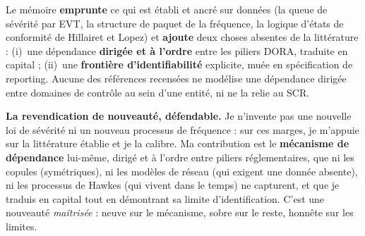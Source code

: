 \documentclass[11pt,a4paper]{article}
\begin{document}
Le mémoire \textbf{emprunte} ce qui est établi et ancré sur données (la queue de sévérité par
EVT, la structure de paquet de la fréquence, la logique d'états de conformité de Hillairet et
Lopez) et \textbf{ajoute} deux choses absentes de la littérature : (i)~une dépendance
\textbf{dirigée et à l'ordre} entre les piliers DORA, traduite en
capital ; (ii)~une \textbf{frontière d'identifiabilité} explicite, muée en spécification de
reporting. Aucune des références recensées ne modélise une dépendance dirigée entre domaines
de contrôle au sein d'une entité, ni ne la relie au SCR.

\begin{cle}
\textbf{La revendication de nouveauté, défendable.} \og Je n'invente pas une nouvelle loi de
sévérité ni un nouveau processus de fréquence : sur ces marges, je m'appuie sur la
littérature établie et je la calibre. Ma contribution est le \textbf{mécanisme de dépendance}
lui-même, dirigé et à l'ordre entre piliers réglementaires, que ni les copules (symétriques),
ni les modèles de réseau (qui exigent une donnée absente), ni les processus de Hawkes (qui
vivent dans le temps) ne capturent, et que je traduis en capital tout en démontrant sa limite
d'identification. \fg{} C'est une nouveauté \emph{maîtrisée} : neuve sur le mécanisme, sobre
sur le reste, honnête sur les limites.
\end{cle}
\end{document}
